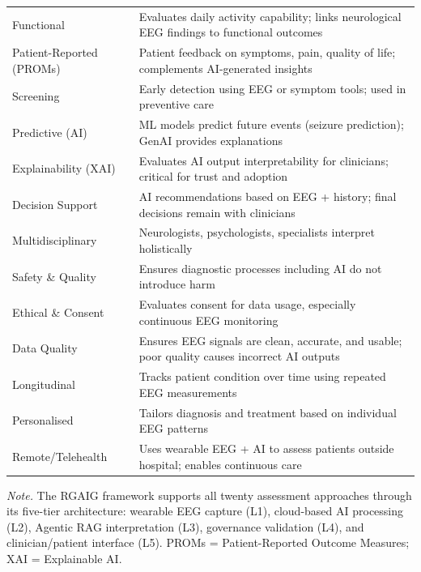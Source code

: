 {\begin{xltabular}{\textwidth}{@{} >{\raggedright\arraybackslash}p{3.2cm} L @{}}
\addlinespace
Functional & Evaluates daily activity capability; links neurological EEG findings to functional outcomes \\
\addlinespace
Patient-Reported (PROMs) & Patient feedback on symptoms, pain, quality of life; complements AI-generated insights \\
\addlinespace
Screening & Early detection using EEG or symptom tools; used in preventive care \\
\addlinespace
Predictive (AI) & ML models predict future events (seizure prediction); GenAI provides explanations \\
\addlinespace
Explainability (XAI) & Evaluates AI output interpretability for clinicians; critical for trust and adoption \\
\addlinespace
Decision Support & AI recommendations based on EEG + history; final decisions remain with clinicians \\
\addlinespace
Multidisciplinary & Neurologists, psychologists, specialists interpret holistically \\
\addlinespace
Safety \& Quality & Ensures diagnostic processes including AI do not introduce harm \\
\addlinespace
Ethical \& Consent & Evaluates consent for data usage, especially continuous EEG monitoring \\
\addlinespace
Data Quality & Ensures EEG signals are clean, accurate, and usable; poor quality causes incorrect AI outputs \\
\addlinespace
Longitudinal & Tracks patient condition over time using repeated EEG measurements \\
\addlinespace
Personalised & Tailors diagnosis and treatment based on individual EEG patterns \\
\addlinespace
Remote/Telehealth & Uses wearable EEG + AI to assess patients outside hospital; enables continuous care \\
\end{xltabular}}
\vspace{0.5em}
\noindent\textit{Note.} The RGAIG framework supports all twenty assessment approaches through its five-tier architecture: wearable EEG capture (L1), cloud-based AI processing (L2), Agentic RAG interpretation (L3), governance validation (L4), and clinician/patient interface (L5). PROMs = Patient-Reported Outcome Measures; XAI = Explainable AI.
\fi %

\label{sec:patient_assessment}
\label{tab:patient_assessment}


